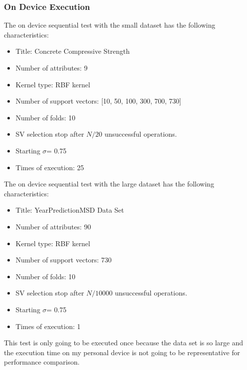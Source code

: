 \subsubsection{On Device Execution}
The on device sequential test with the small dataset has the following characteristics:
\begin{itemize}
	\item Title: Concrete Compressive Strength\cite{UCIMachi66:online}
	\item Number of attributes: 9
	\item Kernel type: RBF kernel
	\item Number of support vectors: [10, 50, 100, 300, 700, 730]
	\item Number of folds: 10
	\item SV selection stop after $N/20$ unsuccessful operations.
	\item Starting $\sigma$= 0.75
	\item Times of execution: 25
\end{itemize}
The on device sequential test with the large dataset has the following characteristics:
\begin{itemize}
	\item Title: YearPredictionMSD Data Set\cite{UCIMachi93:online}
	\item Number of attributes: 90
	\item Kernel type: RBF kernel
	\item Number of support vectors: 730
	\item Number of folds: 10
	\item SV selection stop after $N/10000$ unsuccessful operations.
	\item Starting $\sigma$= 0.75
	\item Times of execution: 1
\end{itemize}
This test is only going to be executed once because the data set is so large and the execution time on my personal device is not going to be representative for performance comparison.
